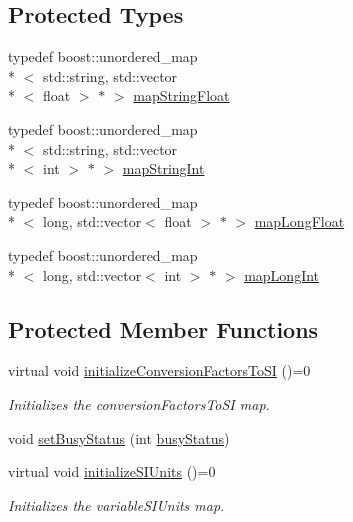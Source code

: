 \subsection*{Protected Types}
\begin{DoxyCompactItemize}
\item 
typedef boost\-::unordered\-\_\-map\\*
$<$ std\-::string, std\-::vector\\*
$<$ float $>$ $\ast$ $>$ \hyperlink{classccmc_1_1_model_a0569e60cc0eab011a5ec40f927e1c307}{map\-String\-Float}
\item 
typedef boost\-::unordered\-\_\-map\\*
$<$ std\-::string, std\-::vector\\*
$<$ int $>$ $\ast$ $>$ \hyperlink{classccmc_1_1_model_a83a7b0a5b5aee6a6058f8c6bf4f51dec}{map\-String\-Int}
\item 
typedef boost\-::unordered\-\_\-map\\*
$<$ long, std\-::vector$<$ float $>$ $\ast$ $>$ \hyperlink{classccmc_1_1_model_ad5da02fd8e4dcfbd4c0425ae6cfdc829}{map\-Long\-Float}
\item 
typedef boost\-::unordered\-\_\-map\\*
$<$ long, std\-::vector$<$ int $>$ $\ast$ $>$ \hyperlink{classccmc_1_1_model_aacb96d67a660454a3287439db8b474a7}{map\-Long\-Int}
\end{DoxyCompactItemize}
\subsection*{Protected Member Functions}
\begin{DoxyCompactItemize}
\item 
virtual void \hyperlink{classccmc_1_1_model_a6f04326691fba448e2cfb7c7ab90a45a}{initialize\-Conversion\-Factors\-To\-S\-I} ()=0
\begin{DoxyCompactList}\small\item\em Initializes the conversion\-Factors\-To\-S\-I map. \end{DoxyCompactList}\item 
void \hyperlink{classccmc_1_1_model_ad4afaf8f5cb1b8bb73034658145b4934}{set\-Busy\-Status} (int \hyperlink{classccmc_1_1_model_acee07d9abc8cb8c0bc3fbaeb879cc251}{busy\-Status})
\item 
virtual void \hyperlink{classccmc_1_1_model_a68d31e8d8cce59269c994de25d048178}{initialize\-S\-I\-Units} ()=0
\begin{DoxyCompactList}\small\item\em Initializes the variable\-S\-I\-Units map. \end{DoxyCompactList}\end{DoxyCompactItemize}
